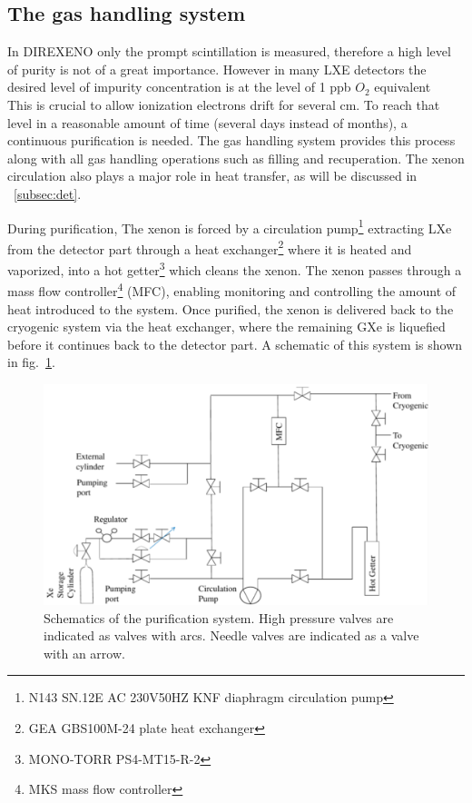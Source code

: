 \subsection{The gas handling system}
\label{subsec:gas}

In DIREXENO only the prompt scintillation is measured, therefore a high level of purity is not of a great importance. However in many LXE detectors the desired level of impurity concentration is at the level of 1 ppb $O_2$ equivalent~\cite{Aprile:2009dv}
This is crucial to allow 
ionization electrons drift for several cm. To reach that level in a reasonable amount 
of time (several days instead of months), 
a continuous purification is needed. The gas handling system provides this process along 
with all gas handling operations such as filling and recuperation. The xenon circulation also plays a major role in heat transfer, as will be discussed in ~\ref{subsec:det}.


During purification, The xenon is forced by a circulation pump\footnote{N143 SN.12E AC 230V50HZ KNF diaphragm circulation pump} extracting LXe from the detector part through a heat exchanger\footnote{GEA GBS100M-24 plate heat exchanger} 
where it is heated and vaporized, into a hot getter\footnote{MONO-TORR PS4-MT15-R-2} which cleans the xenon. The xenon passes through a mass flow controller\footnote{MKS mass flow controller} (MFC), 
enabling monitoring and controlling the amount of heat introduced to the system.  Once purified, the xenon is delivered back to the cryogenic system 
via the heat exchanger, where the remaining GXe is 
liquefied before it continues back to the detector part. A schematic of this 
system is shown in fig.~\ref{fig:gasSchematic}.


\begin{figure}[h]
\centerline{\includegraphics[width=0.75\linewidth]{GasSchematics.png}}
\caption{Schematics of the purification system. High pressure valves are indicated as 
valves with arcs. Needle valves are indicated as 
a valve with an arrow.}
\label{fig:gasSchematic}
\end{figure}


